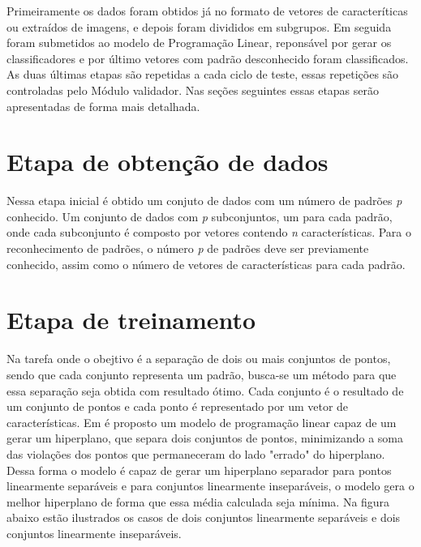 Primeiramente os dados foram obtidos já no formato de vetores de caracteríticas ou extraídos de imagens, e depois foram divididos em subgrupos. Em seguida foram submetidos ao modelo de Programação Linear, reponsável por gerar os classificadores e por último vetores com padrão desconhecido foram classificados. As duas últimas etapas são repetidas a cada ciclo de teste, essas repetições são controladas pelo Módulo validador. Nas seções seguintes essas etapas serão apresentadas de forma mais detalhada.

\section{Etapa de obtenção de dados}
Nessa etapa inicial é obtido um conjuto de dados com um número de padrões \textit{p} conhecido. Um conjunto de dados com \textit{p} subconjuntos, um para cada padrão, onde cada subconjunto é composto por vetores contendo \textit{n} características. Para o reconhecimento de padrões, o número \textit{p} de padrões deve ser previamente conhecido, assim como o número de vetores de características para cada padrão.

\section{Etapa de treinamento}
Na tarefa onde o obejtivo é a separação de dois ou mais conjuntos de pontos, sendo que cada conjunto representa um padrão, busca-se um método para que essa separação seja obtida com resultado ótimo. Cada conjunto é o resultado de um conjunto de pontos e cada ponto é representado por um vetor de características.
Em \cite{Bennett92robustlinear} é proposto um modelo de programação linear capaz de um gerar um hiperplano, que separa dois conjuntos de pontos, minimizando a soma das violações dos pontos que permaneceram do lado "errado" do hiperplano. Dessa forma o modelo é capaz de gerar um hiperplano separador para pontos linearmente separáveis e para conjuntos linearmente inseparáveis, o modelo gera o melhor hiperplano de forma que essa média calculada seja mínima. Na figura abaixo estão ilustrados os casos de dois conjuntos linearmente separáveis e dois conjuntos linearmente inseparáveis.
 
